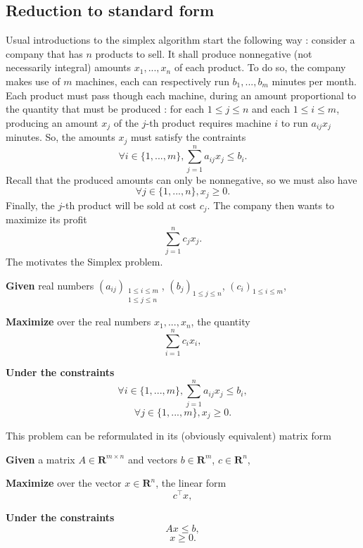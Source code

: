 
\subsection{Reduction to standard form}

Usual introductions to the simplex algorithm start the following way : consider a company that has $ n $ products to sell. It shall produce nonnegative (not necessarily integral) amounts $ x_1,...,x_n $ of each product. To do so, the company makes use of $ m $ machines, each can respectively run $ b_1, ..., b_m $ minutes per month. Each product must pass though each machine, during an amount proportional to the quantity that must be produced : for each $ 1 \le j \le n $ and each $ 1 \le i \le m $, producing an amount $ x_j $ of the $ j $-th product requires machine $ i $ to run $ a_{ij}x_j $ minutes. So, the amounts $ x_j $ must satisfy the contraints
\[
    \forall i \in \{ 1,...,m \}, \sum_{j=1}^n a_{ij} x_j \leqslant b_i.
\]
Recall that the produced amounts can only be nonnegative, so we must also have
\[
    \forall j \in \{ 1,...,n \}, x_j \geqslant 0.
\]
Finally, the $ j $-th product will be sold at cost $ c_j $. The company then wants to maximize its profit
\[
    \sum_{j=1}^n c_j x_j.
\]
The motivates the Simplex problem.

\begin{problem}
    \textbf{Given} real numbers $ (a_{ij})_{\substack{1 \leq i \leq m \\ 1 \leq j \leq n}} $, $ (b_j)_{1 \leq j \leq n} $, $ (c_i)_{1 \leq i \leq m} $,

    \textbf{Maximize} over the real numbers $ x_1, ..., x_n $, the quantity
    \[
        \sum_{i=1}^n c_i x_i,
    \]

    \textbf{Under the constraints}
    \[
        \forall i \in \{ 1, ..., m \}, \sum_{j=1}^n a_{ij} x_j \leqslant b_i,
    \]
    \[
        \forall j \in \{ 1, ..., m \}, x_j \geqslant 0.
    \]
\end{problem}

This problem can be reformulated in its (obviously equivalent) matrix form

\begin{problem}
    \textbf{Given} a matrix $ A \in \mathbf R^{m \times n} $ and vectors $ b \in \mathbf R^m $, $ c \in \mathbf R^n $,

    \textbf{Maximize} over the vector $ x \in \mathbf R^n $, the linear form
    \[
        c^\top x,
    \]

    \textbf{Under the constraints}
    \[
        Ax \leqslant b,
    \]
    \[
        x \geqslant 0.
    \]
\end{problem}

